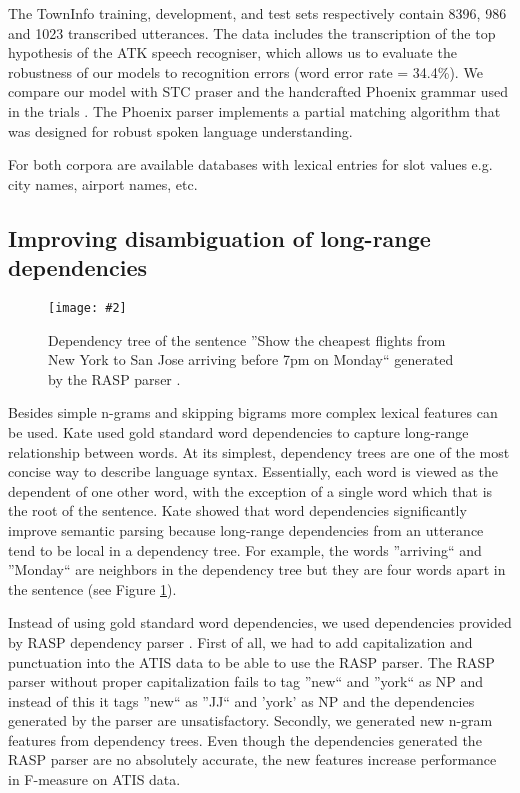 \documentclass{article}
\newcommand{\citep}[1]{\cite{#1}}
\newcommand{\fgrparam}[4]{
  \begin{figure}[htbp]
    \begin{center}
      \leavevmode
      \texttt{[image: \#2]}
    \end{center}
    \caption{#4}
    \label{#3}
  \end{figure}
}
\begin{document}
The TownInfo training, development, and test sets respectively contain
8396, 986 and 1023 transcribed utterances.  The data includes the transcription of the top hypothesis of the ATK speech recogniser, which allows us to evaluate the robustness of our models to recognition
errors (word error rate = 34.4\%). 
We compare our model with STC praser \cite{mairesse09} and the handcrafted Phoenix grammar \cite{ward91} used in the trials \cite{williams07,thomson08}. The Phoenix parser implements a partial matching algorithm that was designed for robust spoken language understanding.

For both corpora are available databases with lexical entries for slot values e.g. city names, airport names, etc. 

\subsection{Improving disambiguation of long-range dependencies}

\fgrparam{width=6cm}{./fig/dep-tree.pdf}{fig:dep:tree}{Dependency tree of the sentence ''Show the cheapest flights from New York to San Jose arriving before 7pm on Monday`` generated by the RASP parser \cite{rasp06}.}

Besides simple n-grams and skipping bigrams more complex lexical features can be used. Kate \citep{kate08} used gold standard word dependencies to capture long-range relationship between words. At its simplest, dependency trees are one of the most concise way to describe language syntax. Essentially, each word is viewed as the dependent of one other word, with the exception of a single word which that is the root of the sentence. Kate showed that word dependencies significantly improve semantic parsing because long-range dependencies from an utterance tend to be local in a dependency tree. For example, the words ''arriving`` and ''Monday`` are neighbors in the dependency tree but they are four words apart in the sentence (see Figure \ref{fig:dep:tree}).

Instead of using gold standard word dependencies, we used dependencies provided by RASP dependency parser \cite{rasp06}. First of all, we had to add capitalization and punctuation into the ATIS data to be able to use the RASP parser. The RASP parser without proper capitalization fails to tag ''new`` and ''york`` as NP and instead of this it tags ''new`` as ''JJ`` and 'york' as NP and the dependencies generated by the parser are unsatisfactory. Secondly, we generated new n-gram features from dependency trees. Even though the dependencies generated the RASP parser are no absolutely accurate, the new features increase performance in F-measure on ATIS data. 
\end{document}
